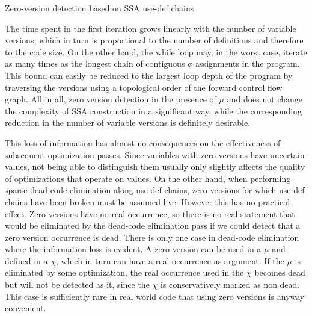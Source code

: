\begin{algorithm}[htpb]
  \caption{\label{alg:hssa:zero-versioning}Zero-version detection based on SSA use-def chains}
\end{algorithm}

The time spent in the first iteration grows linearly with the number of variable versions, which in turn is proportional to the number of definitions and therefore to the code size.
On the other hand, the while loop may, in the worst case, iterate as many times as the longest chain of contiguous $\phi$ assignments in the program. This bound can easily be reduced to the largest loop depth of the program by traversing the versions using a topological order of the forward control flow graph.
All in all, zero version detection in the presence of $\mu$ and \chifuns does not change the complexity of SSA construction in a significant way, while the corresponding reduction in the number of variable versions is definitely desirable.

This loss of information has almost no consequences on the effectiveness of subsequent optimization passes.
Since variables with zero versions have uncertain values, not being able to distinguish them usually only slightly affects the quality of optimizations that operate on values.
On the other hand, when performing sparse dead-code elimination along use-def chains, zero versions for which use-def chains have been broken must be assumed live. However this has no practical effect. Zero versions have no real occurrence, so there is no real statement that would be eliminated by the dead-code elimination pass if we could detect that a zero version occurrence is dead.
There is only one case in dead-code elimination where the information loss is evident. A zero version can be used in a $\mu$ and defined in a $\chi$, which in turn can have a real occurrence as argument. If the $\mu$ is eliminated by some optimization, the real occurrence used in the $\chi$ becomes dead but will not be detected as it, since the $\chi$ is conservatively marked as non dead. This case is sufficiently rare in real world code that using zero versions is anyway convenient.


